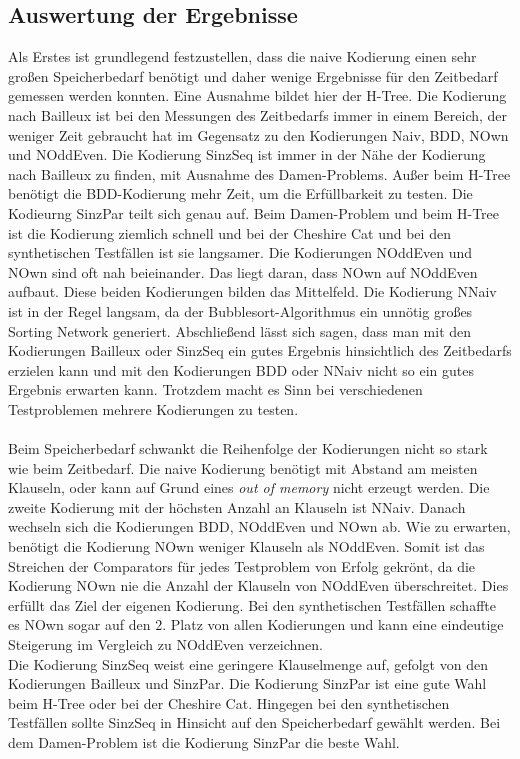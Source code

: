 \documentclass[a4,abstract=on]{scrartcl}
\begin{document}
\subsection{Auswertung der Ergebnisse}
Als Erstes ist grundlegend festzustellen, dass die naive Kodierung einen sehr großen Speicherbedarf benötigt und daher wenige Ergebnisse für den Zeitbedarf gemessen werden konnten. Eine Ausnahme bildet hier der H-Tree. Die Kodierung nach Bailleux ist bei den Messungen des Zeitbedarfs immer in einem Bereich, der weniger Zeit gebraucht hat im Gegensatz zu den Kodierungen Naiv, BDD, NOwn und NOddEven. Die Kodierung SinzSeq ist immer in der Nähe der Kodierung nach Bailleux zu finden, mit Ausnahme des Damen-Problems. Außer beim H-Tree benötigt die BDD-Kodierung mehr Zeit, um die Erfüllbarkeit zu testen. Die Kodieurng SinzPar teilt sich genau auf. Beim Damen-Problem und beim H-Tree ist die Kodierung ziemlich schnell und bei der Cheshire Cat und bei den synthetischen Testfällen ist sie langsamer. Die Kodierungen NOddEven und NOwn sind oft nah beieinander. Das liegt daran, dass NOwn auf NOddEven aufbaut. Diese beiden Kodierungen bilden das Mittelfeld. Die Kodierung NNaiv ist in der Regel langsam, da der Bubblesort-Algorithmus ein unnötig großes Sorting Network generiert. Abschließend lässt sich sagen, dass man mit den Kodierungen Bailleux oder SinzSeq ein gutes Ergebnis hinsichtlich des Zeitbedarfs erzielen kann und mit den Kodierungen BDD oder NNaiv nicht so ein gutes Ergebnis erwarten kann. Trotzdem macht es Sinn bei verschiedenen Testproblemen mehrere Kodierungen zu testen.\\
\ \\
Beim Speicherbedarf schwankt die Reihenfolge der Kodierungen nicht so stark wie beim Zeitbedarf. Die naive Kodierung benötigt mit Abstand am meisten Klauseln, oder kann auf Grund eines \textit{out of memory} nicht erzeugt werden. Die zweite Kodierung mit der höchsten Anzahl an Klauseln ist NNaiv. Danach wechseln sich die Kodierungen BDD, NOddEven und NOwn ab. Wie zu erwarten, benötigt die Kodierung NOwn weniger Klauseln als NOddEven. Somit ist das Streichen der Comparators für jedes Testproblem von Erfolg gekrönt, da die Kodierung NOwn nie die Anzahl der Klauseln von NOddEven überschreitet. Dies erfüllt das Ziel der eigenen Kodierung. Bei den synthetischen Testfällen schaffte es NOwn sogar auf den $2.$ Platz von allen Kodierungen und kann eine eindeutige Steigerung im Vergleich zu NOddEven verzeichnen.\\
Die Kodierung SinzSeq weist eine geringere Klauselmenge auf, gefolgt von den Kodierungen Bailleux und SinzPar. Die Kodierung SinzPar ist eine gute Wahl beim H-Tree oder bei der Cheshire Cat. Hingegen bei den synthetischen Testfällen sollte SinzSeq in Hinsicht auf den Speicherbedarf gewählt werden. Bei dem Damen-Problem ist die Kodierung SinzPar die beste Wahl. \\
\end{document}
